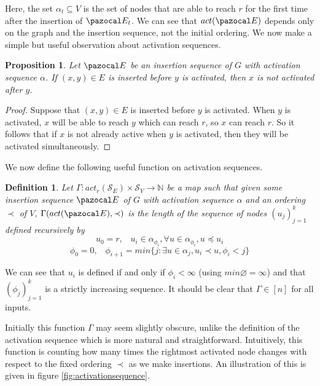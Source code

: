 \documentclass{report}
\newtheorem{proposition}[theorem]{Proposition}
\newtheorem{definition}[theorem]{Definition}
\begin{document}
Here, the set $\alpha_t \subseteq V$ is the set of nodes that are able to reach $r$ for the first time after the insertion of $\pazocal E_t$. We can see that $act(\pazocal E)$ depends only on the graph and the insertion sequence, not the initial ordering. We now make a simple but useful observation about activation sequences.

\begin{proposition}\label{activation prop 1}
Let $\pazocal E$ be an insertion sequence of $G$ with activation sequence $\alpha$. If $(x,y) \in E$ is inserted before $y$ is activated, then $x$ is not activated after $y$.
\end{proposition}

\begin{proof}
Suppose that $(x,y) \in E$ is inserted before $y$ is activated. When $y$ is activated, $x$ will be able to reach $y$ which can reach $r$, so $x$ can reach $r$. So it follows that if $x$ is not already active when $y$ is activated, then they will be activated simultaneously.
\end{proof}

We now define the following useful function on activation sequences.

\begin{definition}\label{gammafunction}
Let $\Gamma : act_r(\mathcal{S}_{E}) \times \mathcal S_V \longrightarrow \mathbb{N}$ be a map such that given some insertion sequence $\pazocal E$ of $G$ with activation sequence $\alpha$ and an ordering $\prec$ of $V$, $\Gamma(act(\pazocal E), \prec)$ is the length of the sequence of nodes $(u_j)_{j=1}^k$ defined recursively by
\[ u_0 = r, \;\;\; u_i \in \alpha_{\phi_i},\forall u \in \alpha_{\phi_i}, u \preceq u_i \]
\[ \phi_0 = 0, \;\;\; \phi_{i+1} = min\{j : \exists u \in \alpha_j, u_i \prec u, \phi_i < j\}\]
\end{definition}

We can see that $u_i$ is defined if and only if $\phi_i < \infty$ (using $min \varnothing = \infty$) and that $(\phi_j)_{j=1}^k$ is a strictly increasing sequence. It should be clear that $\Gamma \in [n]$ for all inputs.

Initially this function $\Gamma$ may seem slightly obscure, unlike the definition of the activation sequence which is more natural and straightforward. Intuitively, this function is counting how many times the rightmost activated node changes with respect to the fixed ordering $\prec$ as we make insertions. An illustration of this is given in figure \ref{fig:activationsequence}.
\end{document}
